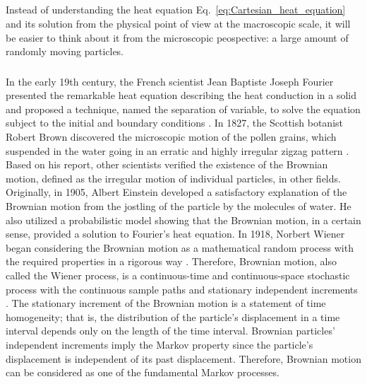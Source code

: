 
\subsection{}\label{background}

Instead of understanding the heat equation
Eq.~\ref{eq:Cartesian_heat_equation} and its solution from the
physical point of view at the macroscopic scale, it will be easier to
think about it from the microscopic peospective: a large amount of
randomly moving particles. 



\subsubsection{}\label{Brownian_Motion}

In the early 19th century, the French scientist Jean Baptiste Joseph
Fourier presented the remarkable heat equation describing the heat
conduction in a solid and proposed a technique, named the separation
of variable, to solve the equation subject to the initial and boundary
conditions \cite{baron1878analytical}. In 1827, the Scottish botanist
Robert Brown discovered the microscopic motion of the pollen grains,
which suspended in the water going in an erratic and highly irregular
zigzag pattern \cite{brown1828microscopical}. Based on his report,
other scientists verified the existence of the Brownian motion,
defined as the irregular motion of individual particles, in other
fields. Originally, in 1905, Albert Einstein
\cite{einstein1905electrodynamics} developed a satisfactory
explanation of the Brownian motion from the jostling of the particle
by the molecules of water. He also utilized a probabilistic model
showing that the Brownian motion, in a certain sense, provided a
solution to Fourier's heat equation. In 1918, Norbert Wiener began
considering the Brownian motion as a mathematical random process with
the required properties in a rigorous way
\cite{wiener1923differential}. Therefore, Brownian motion, also called
the Wiener process, is a continuous-time and continuous-space
stochastic process with the continuous sample paths and stationary
independent increments \cite{ito2012diffusion}
\cite{karlin2014first}. The stationary increment of the Brownian
motion is a statement of time homogeneity; that is, the distribution
of the particle's displacement in a time interval depends only on the
length of the time interval. Brownian particles' independent
increments imply the Markov property since the particle's displacement
is independent of its past displacement. Therefore, Brownian motion
can be considered as one of the fundamental Markov processes.


